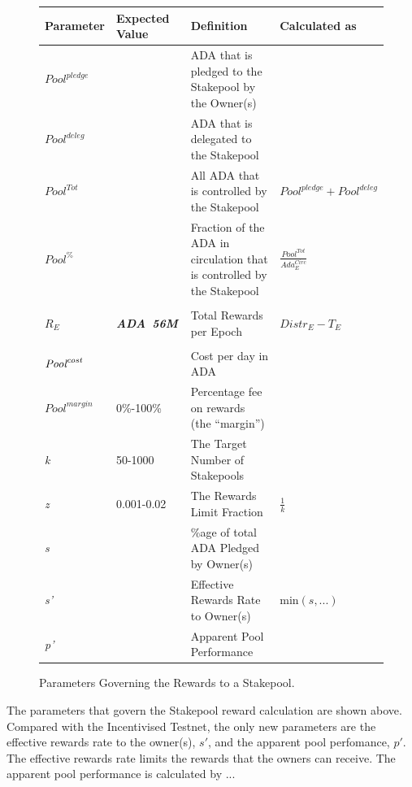 \documentclass[11pt,a4paper,dvipsnames,twosided,final]{article}
\newcommand{\khcomment}[1]{\todo[color=blue!20]{KH: #1}}
\newcommand{\ada}{ADA{}}
\newcommand{\ADA}[1]{\textbf{\emph{\ada~{#1}}}}
\begin{document}
\begin{figure}[h!]
\begin{center}
\begin{tabular}{||l|l|p{6cm}|l||}
  \hline \hline
\textbf{Parameter} & \textbf{Expected Value} & \textbf{Definition} & \textbf{Calculated as} \\\hline
{\color{red} ${Pool}^\textit{pledge}$} & & {\color{red} \ada{} that is pledged to the Stakepool by the Owner(s)} & \\\hline
{\color{blue} ${\textit{Pool}}^\textit{deleg}$} & & {\color{blue} \ada{} that is delegated to the Stakepool} & \\\hline
${\textit{Pool}}^{Tot}$ & & All \ada{} that is controlled by the Stakepool & ${\textit{Pool}}^\textit{pledge} + {\textit{Pool}}^\textit{deleg}$ \\\hline
  ${\textit{Pool}}^\%$ & & Fraction of the \ada{} in circulation that is controlled by the Stakepool & {\large $\frac{{\textit{Pool}}^{Tot}}{\textit{Ada}^{Circ}_E}$} \\\hline
&&&  \\\hline
$R_E$ & \ADA{56M} & Total Rewards per Epoch & ${Distr}_E - T_E$ \\\hline
&&&  \\\hline
{\color{red} $\textit{\textit{Pool}}^{\textit{cost}}$} &  & {\color{red} Cost per day in \ada{}} & \\\hline
{\color{red} ${\textit{Pool}}^{\textit{margin}}$} &  {\color{red} 0\%-100\%} & {\color{red} Percentage fee on rewards (the ``margin'')} & \\\hline
\emph{k} & 50-1000 & The Target Number of Stakepools & \\\hline
\emph{z} & 0.001-0.02 & The Rewards Limit Fraction & $\frac{1}{k}$ \\\hline
\emph{s} & & \%age of total ADA Pledged by Owner(s) & \\\hline
\emph{s'} & & Effective Rewards Rate to Owner(s) & $\textrm{min} (s,...)$\\\hline
\emph{p'} & & Apparent Pool Performance\khcomment{Explain this.} & \\\hline
  \hline
\end{tabular}
\end{center}
\caption{Parameters Governing the Rewards to a Stakepool.}
\label{fig:rewards}
\end{figure}

\noindent
The parameters that govern the Stakepool reward calculation are shown above.  Compared with the Incentivised
Testnet, the only new parameters are the effective rewards rate to the owner(s), $s'$, and the apparent pool perfomance, $p'$.
The effective rewards rate limits the rewards that the owners can receive.  The apparent pool performance is calculated
by ...\khcomment{Fill this in.}
\end{document}
